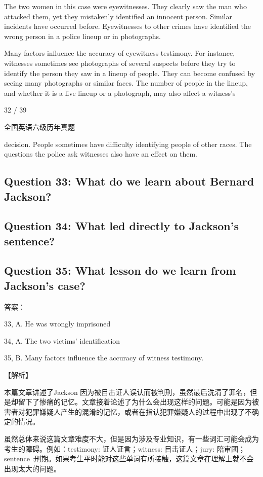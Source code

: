 \documentclass[UTF8,11pt]{ctexart}
\begin{document}
The two women in this case were eyewitnesses. They clearly saw the man who attacked them, yet they mistakenly identified an innocent person. Similar incidents have occurred before. Eyewitnesses to other crimes have identified the wrong person in a police lineup or in photographs.


Many factors influence the accuracy of eyewitness testimony. For instance, witnesses sometimes see photographs of several suspects before they try to identify the person they saw in a lineup of people. They can become confused by seeing many photographs or similar faces. The number of people in the lineup, and whether it is a live lineup or a photograph, may also affect a witness's


32 / 39


全国英语六级历年真题


decision. People sometimes have difficulty identifying people of other races. The questions the police ask witnesses also have an effect on them.


\subsection*{Question 33: What do we learn about Bernard Jackson?}


\subsection*{Question 34: What led directly to Jackson’s sentence?}


\subsection*{Question 35: What lesson do we learn from Jackson’s case?}


答案：


33, A. He was wrongly imprisoned


34, A. The two victims’ identification


35, B. Many factors influence the accuracy of witness testimony.


【解析】


本篇文章讲述了Jackson 因为被目击证人误认而被判刑，虽然最后洗清了罪名，但是却留下了惨痛的记忆。文章接着论述了为什么会出现这样的问题。可能是因为被害者对犯罪嫌疑人产生的混淆的记忆，或者在指认犯罪嫌疑人的过程中出现了不确定的情况。


虽然总体来说这篇文章难度不大，但是因为涉及专业知识，有一些词汇可能会成为考生的障碍。例如：testimony: 证人证言；witness: 目击证人；jury: 陪审团；sentence :刑期。如果考生平时能对这些单词有所接触，这篇文章在理解上就不会出现太大的问题。
\end{document}
